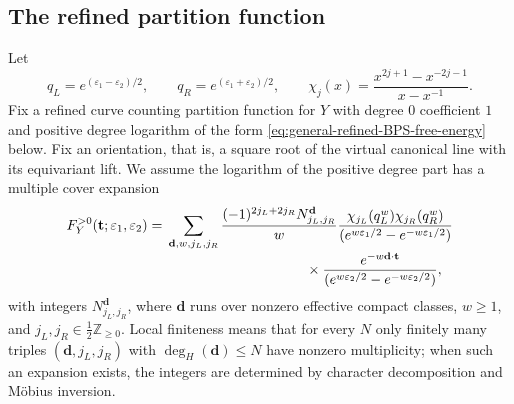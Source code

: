 \documentclass{amsart}
\theoremstyle{definition}
\numberwithin{equation}{section}
\newcommand{\Z}{\mathbb Z}
\newcommand{\eps}{\varepsilon}
\begin{document}
\subsection{The refined partition function}
Let
\[
 q_L=e^{(\eps_1-\eps_2)/2},\qquad
 q_R=e^{(\eps_1+\eps_2)/2},\qquad
 \chi_j(x)=\frac{x^{2j+1}-x^{-2j-1}}{x-x^{-1}}.
\]
Fix a refined curve counting partition function for \(Y\) with degree \(0\) coefficient \(1\) and positive degree logarithm of the form \eqref{eq:general-refined-BPS-free-energy} below.  Fix an orientation, that is, a square root of the virtual canonical line with its equivariant lift.  We assume the logarithm of the positive degree part has a multiple cover expansion
\begin{equation}
\begin{aligned}
 F_Y^{>0}(\mathbf t;\eps_1,\eps_2)
 ={}&\sum_{\mathbf d,w,j_L,j_R}
 \frac{(-1)^{2j_L+2j_R}N^{\mathbf d}_{j_L,j_R}}{w}
 \frac{\chi_{j_L}(q_L^w)\chi_{j_R}(q_R^w)}
 {(e^{w\eps_1/2}-e^{-w\eps_1/2})}\\[-2pt]
 &\hspace{35mm}\times
 \frac{e^{-w\mathbf d\cdot\mathbf t}}
 {(e^{w\eps_2/2}-e^{-w\eps_2/2})},
\end{aligned}
\label{eq:general-refined-BPS-free-energy}
\end{equation}
with integers \(N^{\mathbf d}_{j_L,j_R}\), where \(\mathbf d\) runs over nonzero effective compact classes, \(w\geq1\), and \(j_L,j_R\in\tfrac12\Z_{\geq0}\).  Local finiteness means that for every \(N\) only finitely many triples \((\mathbf d,j_L,j_R)\) with \(\deg_H(\mathbf d)\leq N\) have nonzero multiplicity; when such an expansion exists, the integers are determined by character decomposition and M\"obius inversion.
\end{document}
